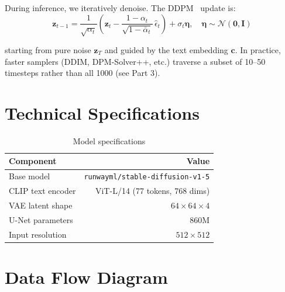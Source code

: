 \documentclass[11pt]{article}
\begin{document}
During inference, we iteratively denoise. The DDPM~\cite{ho2020denoising} update is:
\begin{equation}
\mathbf{z}_{t-1} = \frac{1}{\sqrt{\alpha_t}}\left(\mathbf{z}_t - \frac{1-\alpha_t}{\sqrt{1-\bar{\alpha}_t}}\, \hat{\epsilon}_t\right) + \sigma_t \bm{\eta}, \quad \bm{\eta} \sim \mathcal{N}(\mathbf{0}, \mathbf{I})
\end{equation}

starting from pure noise $\mathbf{z}_T$ and guided by the text embedding $\mathbf{c}$. In practice, faster samplers (DDIM, DPM-Solver++, etc.) traverse a subset of 10--50 timesteps rather than all 1000 (see Part 3).

\section{Technical Specifications}

\begin{table}[!htbp]
\centering
\caption{Model specifications}
\begin{tabular}{lr}
\toprule
Component & Value \\
\midrule
Base model & \texttt{runwayml/stable-diffusion-v1-5} \\
CLIP text encoder & ViT-L/14 (77 tokens, 768 dims) \\
VAE latent shape & $64 \times 64 \times 4$ \\
U-Net parameters & 860M \\
Input resolution & $512 \times 512$ \\
\bottomrule
\end{tabular}
\end{table}

\section{Data Flow Diagram}
\end{document}
